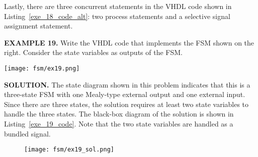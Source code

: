 Lastly, there are three concurrent statements in the VHDL code shown in Listing~\ref{exe_18_code_alt}: two process statements and a selective signal assignment statement. 

\begin{leftbar}
\begin{minipage}[t]{0.5\textwidth}
\vspace{10pt}
\noindent
\textbf{EXAMPLE 19.}
Write the VHDL code that implements the FSM shown on the right. Consider the state variables as outputs of the FSM.
\end{minipage}
\begin{minipage}[t]{0.47\textwidth}
\vspace{0pt}\raggedright
\centering
\texttt{[image: fsm/ex19.png]}
\end{minipage}
\end{leftbar}
\noindent
\textbf{SOLUTION.} The state diagram shown in this problem indicates that this is a three-state FSM with one Mealy-type external output and one external input. Since there are three states, the solution requires at least two state variables to handle the three states. The black-box diagram of the solution is shown in Listing~\ref{exe_19_code}. Note that the two state variables are handled as a bundled signal.


\begin{figure}[!h]
    \centering
	\texttt{[image: fsm/ex19\_sol.png]}
\end{figure}


